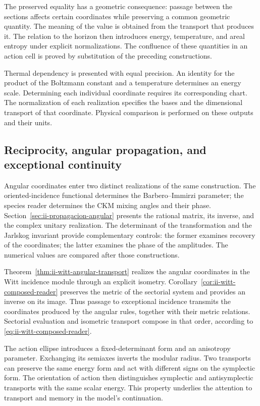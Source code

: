 The preserved equality has a geometric consequence:
passage between the sections affects certain coordinates while
preserving a common geometric quantity. The meaning of the value is
obtained from the transport that produces it. The relation to the horizon
then introduces energy, temperature, and areal entropy under
explicit normalizations. The confluence of these quantities in an
action cell is proved by substitution of the preceding
constructions.

Thermal dependency is presented with equal precision. An identity
for the product of the Boltzmann constant and a temperature
determines an energy scale. Determining each individual coordinate
requires its corresponding chart. The normalization of each realization specifies the bases and the
dimensional transport of that coordinate.
Physical comparison is performed on these outputs and their units.

\subsection{Reciprocity, angular propagation, and exceptional continuity}

Angular coordinates enter two distinct realizations
of the same construction. The oriented-incidence functional determines
the Barbero--Immirzi parameter; the species reader determines the
CKM mixing angles and their phase. Section~\ref{sec:ii-propagacion-angular}
presents the rational matrix, its inverse, and the complex unitary realization.
The determinant of the transformation and the Jarlskog invariant
provide complementary controls: the former examines recovery
of the coordinates; the latter examines the phase of the amplitudes. The
numerical values are compared after those constructions.

Theorem~\ref{thm:ii-witt-angular-transport} realizes the angular
coordinates in the Witt incidence module through an explicit
isometry. Corollary~\ref{cor:ii-witt-composed-reader} preserves the
metric of the sectorial system and provides an inverse on its image.
Thus passage to exceptional incidence transmits the coordinates
produced by the angular rules, together with their metric relations.
Sectorial evaluation and isometric transport compose in that
order, according to \eqref{eq:ii-witt-composed-reader}.

The action ellipse introduces a fixed-determinant form and an
anisotropy parameter. Exchanging its semiaxes inverts the
modular radius. Two transports can preserve the same energy
form and act with different signs on the symplectic form.
The orientation of action then distinguishes symplectic and
antisymplectic transports with the same scalar energy. This property underlies
the attention to transport and memory in the model's continuation.

